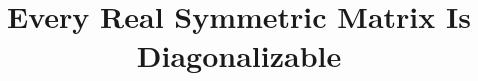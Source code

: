 \documentclass[11pt, oneside]{amsart}
\begin{document}
\title{Every Real Symmetric Matrix Is Diagonalizable}
\maketitle













\end{document}
